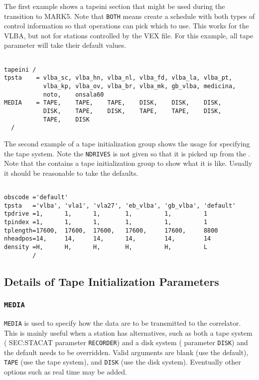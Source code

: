 \documentclass{report}
\begin{document}
The first example shows a tapeini section that might be used during
the transition to MARK5.  Note that {\tt BOTH} means create a
schedule with both types of control information so that operations
can pick which to use.  This works for the VLBA, but not for
stations controlled by the VEX file.  For this example, all
tape parameter will take their default values.

\begin{verbatim}

tapeini /
tpsta    = vlba_sc, vlba_hn, vlba_nl, vlba_fd, vlba_la, vlba_pt,
           vlba_kp, vlba_ov, vlba_br, vlba_mk, gb_vlba, medicina,
           noto,    onsala60
MEDIA    = TAPE,    TAPE,    TAPE,    DISK,    DISK,    DISK,
           DISK,    TAPE,    DISK,    TAPE,    TAPE,    DISK,
           TAPE,    DISK
  /
\end{verbatim}

The second example of a tape initialization group shows the usage for
specifying the tape system.  Note the {\tt NDRIVES} is not given so
that it is picked up from the .
Note that the 
contains a tape initialization group to show what it is like.  Usually
it should be reasonable to take the defaults.


\begin{verbatim}

obscode ='default'
tpsta   ='vlba', 'vla1', 'vla27', 'eb_vlba', 'gb_vlba', 'default'
tpdrive =1,      1,      1,       1,         1,         1
tpindex =1,      1,      1,       1,         1,         1
tplength=17600,  17600,  17600,   17600,     17600,     8800
nheadpos=14,     14,     14,      14,        14,        14
density =H,      H,      H,       H,         H,         L
        /

\end{verbatim}

\subsection{Details of Tape Initialization Parameters}

\subsubsection{\label{TP:MEDIA}{\tt MEDIA}}

{\tt MEDIA} is used to specify how the data are to be transmitted to
the correlator.  This is mainly useful when a station has
alternatives, such as both a tape system (
{SEC:STACAT} parameter {\tt RECORDER}) and a disk system
( parameter {\tt DISK}) and the
default needs to be overridden.  Valid arguments are blank (use the
default), {\tt TAPE} (use the tape system), and {\tt DISK} (use the
disk system).  Eventually other options such as real time may be
added.
\end{document}
